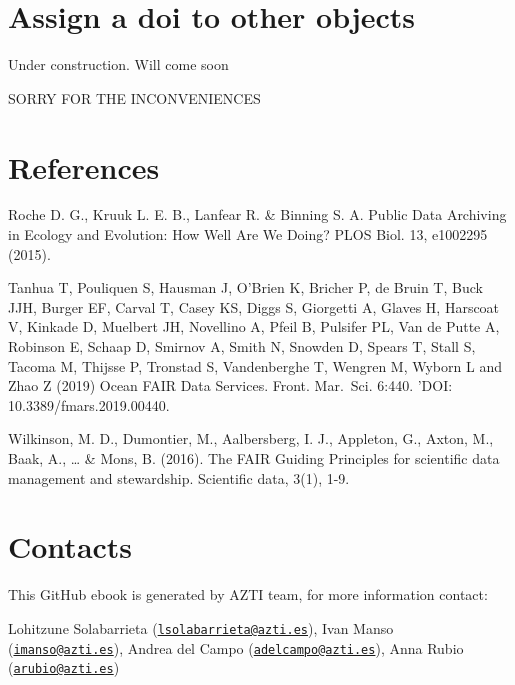 \documentclass[
]{book}
\begin{document}
\hypertarget{assign-a-doi-to-other-objects}{%
\chapter{Assign a doi to other objects}\label{assign-a-doi-to-other-objects}}

Under construction. Will come soon

SORRY FOR THE INCONVENIENCES

\hypertarget{references}{%
\chapter*{References}\label{references}}

Roche D. G., Kruuk L. E. B., Lanfear R. \& Binning S. A. Public Data Archiving in Ecology and Evolution: How Well Are We Doing? PLOS Biol. 13, e1002295 (2015).

Tanhua T, Pouliquen S, Hausman J, O'Brien K, Bricher P, de Bruin T, Buck JJH, Burger EF, Carval T, Casey KS, Diggs S, Giorgetti A, Glaves H, Harscoat V, Kinkade D, Muelbert JH, Novellino A, Pfeil B, Pulsifer PL, Van de Putte A, Robinson E, Schaap D, Smirnov A, Smith N, Snowden D, Spears T, Stall S, Tacoma M, Thijsse P, Tronstad S, Vandenberghe T, Wengren M, Wyborn L and Zhao Z (2019) Ocean FAIR Data Services. Front. Mar.~Sci. 6:440. 'DOI: 10.3389/fmars.2019.00440.

Wilkinson, M. D., Dumontier, M., Aalbersberg, I. J., Appleton, G., Axton, M., Baak, A., \ldots{} \& Mons, B. (2016). The FAIR Guiding Principles for scientific data management and stewardship. Scientific data, 3(1), 1-9.

\hypertarget{contacts}{%
\chapter*{Contacts}\label{contacts}}

This GitHub ebook is generated by AZTI team, for more information contact:

Lohitzune Solabarrieta (\href{mailto:lsolabarrieta@azti.es}{\nolinkurl{lsolabarrieta@azti.es}}),
Ivan Manso (\href{mailto:imanso@azti.es}{\nolinkurl{imanso@azti.es}}),
Andrea del Campo (\href{mailto:adelcampo@azti.es}{\nolinkurl{adelcampo@azti.es}}),
Anna Rubio (\href{mailto:arubio@azti.es}{\nolinkurl{arubio@azti.es}})

  
\end{document}
